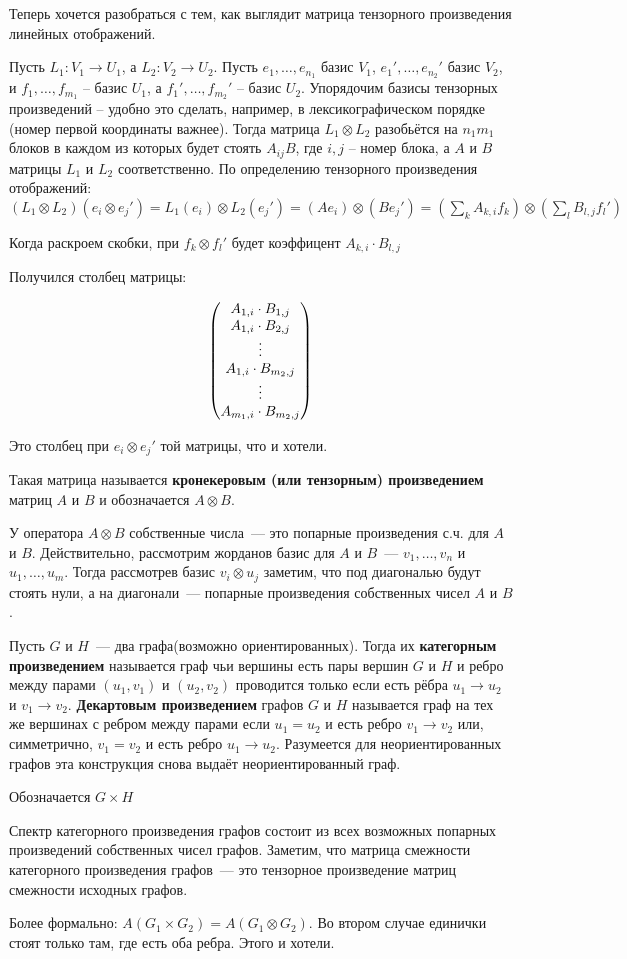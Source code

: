 Теперь хочется разобраться с тем, как выглядит матрица тензорного произведения линейных отображений.

\lm
	Пусть $L_1 \colon V_1 \to U_1$, а $L_2 \colon V_2 \to U_2$. Пусть $e_1,\dots, e_{n_1}$ базис $V_1$,  $e_1',\dots, e_{n_2}'$ базис $V_2$,  и $f_1,\dots, f_{m_1}$ -- базис $U_1$, а $f_1',\dots, f_{m_2}'$ -- базис $U_2$. 
	Упорядочим базисы тензорных произведений -- удобно это сделать, например, в лексикографическом порядке (номер первой координаты важнее).
	Тогда матрица  $L_1\otimes L_2$  разобьётся на $n_1m_1$ блоков в каждом из которых будет стоять $ A_{ij} B$, где $i,j$ -- номер блока, а $A$ и $B$ матрицы $L_1$ и $L_2$ соответственно.
	\proof
		По определению тензорного произведения отображений: $(L_1\otimes L_2)(e_i\otimes e_j') = L_1(e_i)\otimes L_2(e_j') = (Ae_i)\otimes (Be_j') = (\sum\limits_{k} A_{k, i} f_k)\otimes(\sum\limits_{l} B_{l, j} f_l')$

		Когда раскроем скобки, при $f_k\otimes f_l'$ будет коэффицент $A_{k, i}\cdot B_{l, j}$

		Получился столбец матрицы:

		$$\begin{pmatrix}
		A_{1, i}\cdot B_{1, j}\\
		A_{1, i}\cdot B_{2, j}\\
		\vdots\\
		A_{1, i}\cdot B_{m_2, j}\\
		\vdots\\
		A_{m_1, i}\cdot B_{m_2, j}
		\end{pmatrix}$$

		Это столбец при $e_i\otimes e_j'$ той матрицы, что и хотели.
	\endproof
\elm

\dfn
	Такая матрица называется {\bf кронекеровым (или тензорным) произведением} матриц $A$ и $B$ и обозначается $A\otimes B$.
\edfn

\lm
	У оператора $A\otimes B$ собственные числа~--- это попарные произведения с.ч. для $A$ и $B$. 
	\proof 
		Действительно, рассмотрим жорданов базис для $A$ и $B$~--- $v_1,\dots,v_n$ и $u_1,\dots, u_m$. Тогда рассмотрев базис $v_i\otimes u_j$ заметим, что под диагональю будут стоять нули, а на диагонали~--- попарные произведения собственных чисел $A$ и $B$.
	\endproof
\elm

\dfn 
	Пусть $G$ и $H$~--- два графа(возможно ориентированных). Тогда их {\bf категорным произведением} называется граф чьи вершины есть пары вершин $G$ и $H$ и ребро между парами $(u_1,v_1)$ и $(u_2,v_2)$ проводится только если есть рёбра $u_1 \to u_2$ и $v_1 \to v_2$. {\bf Декартовым произведением} графов $G$ и $H$ называется граф на тех же вершинах с ребром между парами если $u_1=u_2$ и есть ребро $v_1\to v_2$ или, симметрично, $v_1=v_2$ и есть ребро $u_1 \to u_2$. Разумеется для неориентированных графов эта конструкция снова выдаёт неориентированный граф.

	Обозначается $G\times H$
\edfn


\lm
	Спектр категорного произведения графов состоит из всех возможных попарных произведений собственных чисел графов.
	\proof 
		Заметим, что матрица смежности категорного произведения графов~--- это тензорное произведение матриц смежности исходных графов.

		Более формально: $A(G_1\times G_2) = A(G_1\otimes G_2)$. Во втором случае единички стоят только там, где есть оба ребра. Этого и хотели.
	\endproof
\elm